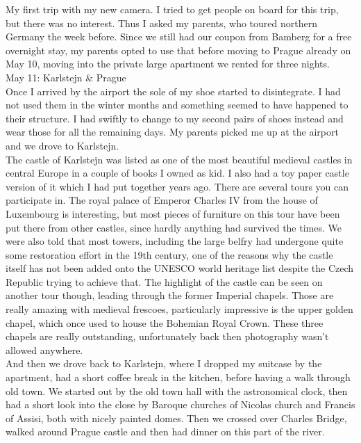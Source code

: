 My first trip with my new camera. I tried to get people on board for this trip, but there was no interest. Thus I asked my parents, who toured northern Germany the week before. Since we still had our coupon from Bamberg for a free overnight stay, my parents opted to use that before moving to Prague already on May 10, moving into the private large apartment we rented for three nights.\\

May 11: Karlstejn \& Prague\\
Once I arrived by the airport the sole of my shoe started to disintegrate. I had not used them in the winter months and something seemed to have happened to their structure. I had swiftly to change to my second pairs of shoes instead and wear those for all the remaining days. My parents picked me up at the airport and we drove to Karlstejn.\\

The castle of Karlstejn was listed as one of the most beautiful medieval castles in central Europe in a couple of books I owned as kid. I also had a toy paper castle version of it which I had put together years ago. There are several tours you can participate in. The royal palace of Emperor Charles IV from the house of Luxembourg is interesting, but most pieces of furniture on this tour have been put there from other castles, since hardly anything had survived the times. We were also told that most towers, including the large belfry had undergone quite some restoration effort in the 19th century, one of the reasons why the castle itself has not been added onto the UNESCO world heritage list despite the Czech Republic trying to achieve that. The highlight of the castle can be seen on another tour though, leading through the former Imperial chapels. Those are really amazing with medieval frescoes, particularly impressive is the upper golden chapel, which once used to house the Bohemian Royal Crown. These three chapels are really outstanding, unfortunately back then photography wasn't allowed anywhere.\\

And then we drove back to Karlstejn, where I dropped my suitcase by the apartment, had a short coffee break in the kitchen, before having a walk through old town. We started out by the old town hall with the astronomical clock, then had a short look into the close by Baroque churches of Nicolas church and Francis of Assisi, both with nicely painted domes. Then we crossed over Charles Bridge, walked around Prague castle and then had dinner on this part of the river.\\

